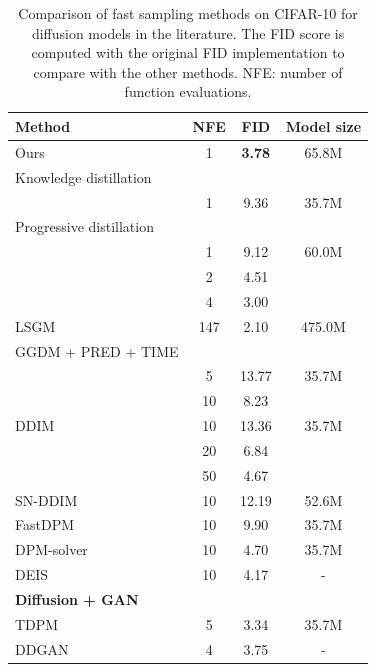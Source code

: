 
\begin{table}[t]
\caption{Comparison of fast sampling methods on CIFAR-10 for diffusion models in the literature. The FID score is computed with the original FID implementation to compare with the other methods. NFE: number of function evaluations.}
\label{tb:fid_cifar}
\vskip 0.1in
\begin{center}
\begin{small}
\begin{tabular}{lccc}
\toprule
Method & NFE & FID & Model size \\
\midrule
Ours    & 1 &  \textbf{3.78} & 65.8M   \\ 
\midrule
Knowledge distillation\\\cite{luhman2021knowledge}  & 1 & 9.36 & 35.7M\\
\midrule
Progressive distillation\\\cite{salimans2021progressive}    & 1 & 9.12 & 60.0M  \\
        & 2 & 4.51  & \\
        & 4 & 3.00  & \\ 
\midrule 
LSGM~\cite{vahdat2021score} & 147 & 2.10  & 475.0M\\
\midrule
GGDM + PRED + TIME\\ \cite{watson2021learning}                      & 5                 & 13.77   &  35.7M  \\
                                         & 10                 & 8.23    &   \\ 
\midrule
DDIM~\cite{song2020denoising}   & 10                & 13.36   &  35.7M \\ 
                                & 20           & 6.84   &   \\
                                & 50 & 4.67 & \\
\midrule 
SN-DDIM~\cite{bao2022estimating} & 10 & 12.19 & 52.6M \\ 
\midrule 
FastDPM~\cite{kong2021fast} & 10    & 9.90 & 35.7M \\ 
\midrule
DPM-solver~\cite{lu2022dpm} & 10 & 4.70 & 35.7M\\ 
\midrule 
DEIS~\cite{zhang2022fast} & 10 & 4.17 & - \\
\toprule 
\textbf{Diffusion + GAN} \\
\midrule
TDPM~\cite{zheng2022truncated} & 5 & 3.34 & 35.7M\\
DDGAN~\cite{xiao2021tackling} & 4 & 3.75 & - \\
\bottomrule
\end{tabular}
\end{small}
\end{center}
\vskip -0.05in
\end{table}
